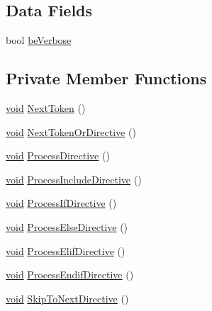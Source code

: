 \subsection*{Data Fields}
\begin{DoxyCompactItemize}
\item 
bool \hyperlink{classparser_1_1_lexer__t_afcfd969aed90e76d994629496d9cf522}{be\+Verbose}
\end{DoxyCompactItemize}
\subsection*{Private Member Functions}
\begin{DoxyCompactItemize}
\item 
\hyperlink{_t_e_m_p_l_a_t_e__cdef_8h_ac9c84fa68bbad002983e35ce3663c686}{void} \hyperlink{classparser_1_1_lexer__t_acdfc28410c6fa02431dc5b0d8eaf6dfe}{Next\+Token} ()
\item 
\hyperlink{_t_e_m_p_l_a_t_e__cdef_8h_ac9c84fa68bbad002983e35ce3663c686}{void} \hyperlink{classparser_1_1_lexer__t_a89d6d4662c92c353287d5a1a9d928a87}{Next\+Token\+Or\+Directive} ()
\item 
\hyperlink{_t_e_m_p_l_a_t_e__cdef_8h_ac9c84fa68bbad002983e35ce3663c686}{void} \hyperlink{classparser_1_1_lexer__t_ae1d3fd3836cf0eda071264cf28e72846}{Process\+Directive} ()
\item 
\hyperlink{_t_e_m_p_l_a_t_e__cdef_8h_ac9c84fa68bbad002983e35ce3663c686}{void} \hyperlink{classparser_1_1_lexer__t_acdd9a9b146e32dc1da868295a234b93c}{Process\+Include\+Directive} ()
\item 
\hyperlink{_t_e_m_p_l_a_t_e__cdef_8h_ac9c84fa68bbad002983e35ce3663c686}{void} \hyperlink{classparser_1_1_lexer__t_a5614319aa2d55284fb8695ca22f6797e}{Process\+If\+Directive} ()
\item 
\hyperlink{_t_e_m_p_l_a_t_e__cdef_8h_ac9c84fa68bbad002983e35ce3663c686}{void} \hyperlink{classparser_1_1_lexer__t_a8fd4065139f3589521658ac1d1406b7f}{Process\+Else\+Directive} ()
\item 
\hyperlink{_t_e_m_p_l_a_t_e__cdef_8h_ac9c84fa68bbad002983e35ce3663c686}{void} \hyperlink{classparser_1_1_lexer__t_aa21e77ed1eb9a6fdb0959ddffd088e0c}{Process\+Elif\+Directive} ()
\item 
\hyperlink{_t_e_m_p_l_a_t_e__cdef_8h_ac9c84fa68bbad002983e35ce3663c686}{void} \hyperlink{classparser_1_1_lexer__t_a7c92f55cf52b6571582be6691ea923ea}{Process\+Endif\+Directive} ()
\item 
\hyperlink{_t_e_m_p_l_a_t_e__cdef_8h_ac9c84fa68bbad002983e35ce3663c686}{void} \hyperlink{classparser_1_1_lexer__t_a3dbb67f205f82cb0da886aa2534a2b6b}{Skip\+To\+Next\+Directive} ()

\end{DoxyCompactItemize}
